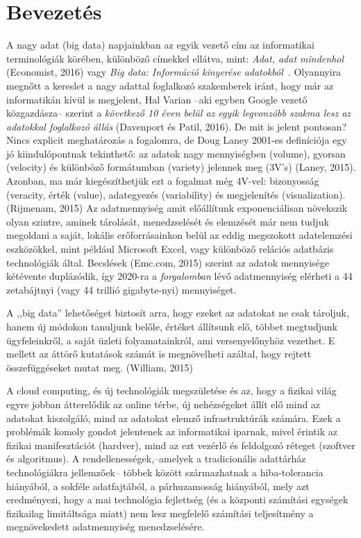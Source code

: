 \documentclass[a4paper,12pt]{article}
\author{Belényesi Roland}
\begin{document}
\tableofcontents
\newpage

\section{Bevezetés}
A nagy adat (big data) napjainkban az egyik vezető cím az informatikai terminológiák körében, különböző címekkel ellátva, mint: 
\textsl{Adat, adat mindenhol} (Economist, 2016) vagy 
\textsl{Big data: Információ kinyerése adatokból}~\parencite{nature}. Olyannyira megnőtt a kereslet a nagy adattal foglalkozó szakemberek iránt, hogy már az informatikán kívül is megjelent, Hal Varian --aki egyben Google vezető közgazdásza-- szerint a \textsl{következő 10 éven belül az egyik legvonzóbb szakma lesz az adatokkal foglalkozó állás} (Davenport és Patil, 2016). De mit is jelent pontosan? Nincs explicit meghatározás a fogalomra, de Doug Laney 2001-es definíciója egy jó kiindulópontnak tekinthető: az adatok nagy mennyiségben (volume), gyorsan (velocity) és különböző formátumban (variety) jelennek meg (3V's) (Laney, 2015). Azonban, ma már kiegészíthetjük ezt a fogalmat még 4V-vel: bizonyosság (veracity, érték (value), adategyezés (variability) és megjelenítés (visualization).(Rijmenam, 2015) Az adatmennyiség amit előállítunk exponenciálisan növekszik olyan szintre, aminek tárolását, menedzselését és elemzését már nem tudjuk megoldani a saját, lokális erőforrásainkon belül az eddig megszokott adatelemzési eszközökkel, mint például Microsoft Excel, vagy különböző relációs adatbázis technológiák által.
Becslések (Emc.com, 2015) szerint az adatok mennyisége kétévente duplázódik, így 2020-ra a \textsl{forgalomban} lévő adatmennyiség elérheti a 44 zetabájtnyi (vagy 44 trillió gigabyte-nyi) mennyiséget.
\newline

A ,,big data'' lehetőséget biztosít arra, hogy ezeket az adatokat ne csak tároljuk, hanem új módokon tanuljunk belőle, értéket állítsunk elő, többet megtudjunk ügyfeleinkről, a saját üzleti folyamatainkról, ami versenyelőnyhöz vezethet. E mellett az áttörő kutatások számát is megnövelheti azáltal, hogy rejtett összefüggéseket mutat meg. (William, 2015)

A cloud computing, és új technológiák megszületése és az, hogy a fizikai világ egyre jobban átterelődik az online térbe, új nehézségeket állít elő mind az adatokat kiszolgáló, mind az adatokat elemző infrastruktúrák számára. Ezek a problémák komoly gondot jelentenek az informatikai iparnak, mivel érintik az fizikai manifesztációt (hardver), mind az ezt vezérlő és feldolgozó réteget (szoftver és algoritmus). A rendellenességek,--amelyek a tradicionális adattárház technológiákra jellemzőek-- többek között származhatnak a hiba-tolerancia hiányából, a sokféle adatfajtából, a párhuzamosság hiányából, mely azt eredményezi, hogy a mai technológia fejlettség (és a központi számítási egységek fizikailag limitáltsága miatt) nem lesz megfelelő számítási teljesítmény a megnövekedett adatmennyiség menedzselésére.
\newpage
\end{document}
